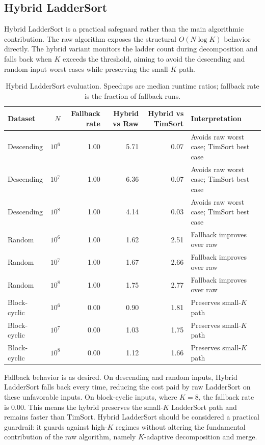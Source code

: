 \documentclass[10pt]{article}
\begin{document}
\subsection{Hybrid LadderSort}
\label{hybrid-laddersort}

Hybrid LadderSort is a practical safeguard rather than the main algorithmic
contribution. The raw algorithm exposes the structural \(O(N\log K)\) behavior
directly. The hybrid variant monitors the ladder count during decomposition and
falls back when \(K\) exceeds the threshold, aiming to avoid the descending and
random-input worst cases while preserving the small-\(K\) path.

\begin{table}[H]
\centering
\scriptsize
\caption{Hybrid LadderSort evaluation. Speedups are median runtime ratios; fallback rate is the fraction of fallback runs.}
\label{tab:phase4-hybrid}
\begin{tabularx}{\linewidth}{@{}l r r r r X@{}}
\toprule
Dataset & \(N\) & Fallback rate & Hybrid vs Raw & Hybrid vs TimSort & Interpretation \\
\midrule
Descending & \(10^6\) & 1.00 & 5.71 & 0.07 & Avoids raw worst case; TimSort best case \\
Descending & \(10^7\) & 1.00 & 6.36 & 0.07 & Avoids raw worst case; TimSort best case \\
Descending & \(10^8\) & 1.00 & 4.14 & 0.03 & Avoids raw worst case; TimSort best case \\
Random & \(10^6\) & 1.00 & 1.62 & 2.51 & Fallback improves over raw \\
Random & \(10^7\) & 1.00 & 1.67 & 2.66 & Fallback improves over raw \\
Random & \(10^8\) & 1.00 & 1.75 & 2.77 & Fallback improves over raw \\
Block-cyclic & \(10^6\) & 0.00 & 0.90 & 1.81 & Preserves small-\(K\) path \\
Block-cyclic & \(10^7\) & 0.00 & 1.03 & 1.75 & Preserves small-\(K\) path \\
Block-cyclic & \(10^8\) & 0.00 & 1.12 & 1.66 & Preserves small-\(K\) path \\
\bottomrule
\end{tabularx}
\end{table}

Fallback behavior is as desired. On descending and random inputs, Hybrid
LadderSort falls back every time, reducing the cost paid by raw LadderSort on
these unfavorable inputs. On block-cyclic inputs, where \(K=8\), the fallback
rate is \(0.00\). This means the hybrid preserves the small-\(K\) LadderSort
path and remains faster than TimSort. Hybrid LadderSort should be considered a
practical guardrail: it guards against high-\(K\) regimes without altering the
fundamental contribution of the raw algorithm, namely \(K\)-adaptive
decomposition and merge.
\end{document}
